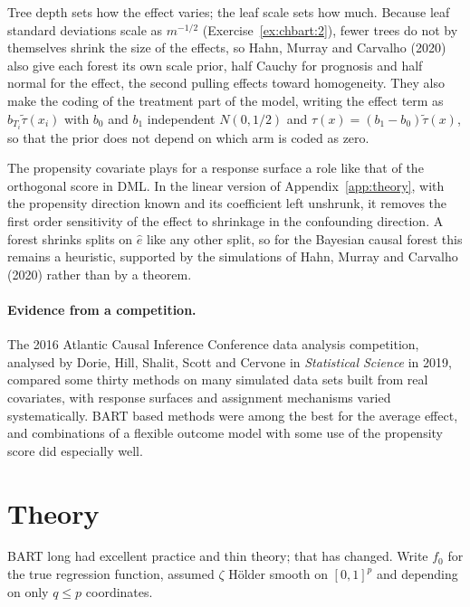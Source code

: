 Tree depth sets how the effect varies; the leaf scale sets how much. Because leaf standard deviations scale as $m^{-1/2}$ (Exercise~\ref{ex:chbart:2}), fewer trees do not by themselves shrink the size of the effects, so Hahn, Murray and Carvalho (2020) also give each forest its own scale prior, half Cauchy for prognosis and half normal for the effect, the second pulling effects toward homogeneity. They also make the coding of the treatment part of the model, writing the effect term as $b_{T_i}\widetilde\tau(x_i)$ with $b_0$ and $b_1$ independent $N(0, 1/2)$ and $\tau(x) = (b_1 - b_0)\widetilde\tau(x)$, so that the prior does not depend on which arm is coded as zero.

The propensity covariate plays for a response surface a role like that of the orthogonal score in DML. In the linear version of Appendix~\ref{app:theory}, with the propensity direction known and its coefficient left unshrunk, it removes the first order sensitivity of the effect to shrinkage in the confounding direction. A forest shrinks splits on $\hat e$ like any other split, so for the Bayesian causal forest this remains a heuristic, supported by the simulations of Hahn, Murray and Carvalho (2020) rather than by a theorem.

\paragraph{Evidence from a competition.} The 2016 Atlantic Causal Inference Conference data analysis competition, analysed by Dorie, Hill, Shalit, Scott and Cervone in \emph{Statistical Science} in 2019, compared some thirty methods on many simulated data sets built from real covariates, with response surfaces and assignment mechanisms varied systematically. BART based methods were among the best for the average effect, and combinations of a flexible outcome model with some use of the propensity score did especially well.



\section{Theory}

BART long had excellent practice and thin theory; that has changed. Write $f_0$ for the true regression function, assumed $\zeta$ H\"older smooth on $[0,1]^p$ and depending on only $q \leq p$ coordinates.

